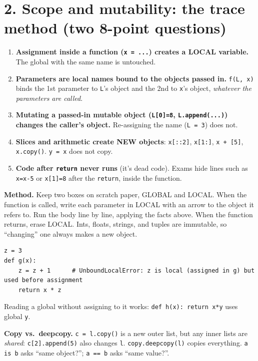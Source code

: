 \documentclass[10pt]{article}
\newcommand{\code}[1]{\lstinline[basicstyle=\ttfamily\small]{#1}}
\begin{document}
\section*{2. Scope and mutability: the trace method (two 8-point questions)}
\begin{keyrule}
\begin{enumerate}[leftmargin=*]
\item \textbf{Assignment inside a function (\code{x = ...}) creates a LOCAL variable.} The global with the same name is untouched.
\item \textbf{Parameters are local names bound to the objects passed in.} \code{f(L, x)} binds the 1st parameter to \code{L}'s object and the 2nd to \code{x}'s object, \emph{whatever the parameters are called}.
\item \textbf{Mutating a passed-in mutable object (\code{L[0]=8}, \code{L.append(...)}) changes the caller's object.} Re-assigning the name (\code{L = 3}) does not.
\item \textbf{Slices and arithmetic create NEW objects}: \code{x[::2]}, \code{x[1:]}, \code{x + [5]}, \code{x.copy()}. \code{y = x} does not copy.
\item \textbf{Code after \code{return} never runs} (it's dead code). Exams hide lines such as \code{x=x-5} or \code{x[1]=8} after the \code{return}, inside the function.
\end{enumerate}
\end{keyrule}
\textbf{Method.} Keep two boxes on scratch paper, GLOBAL and LOCAL. When the function is called, write each parameter in LOCAL with an arrow to the object it refers to. Run the body line by line, applying the facts above. When the function returns, erase LOCAL. Ints, floats, strings, and tuples are immutable, so ``changing'' one always makes a new object.

\begin{trap}
\begin{lstlisting}
z = 3
def g(x):
    z = z + 1      # UnboundLocalError: z is local (assigned in g) but used before assignment
    return x * z
\end{lstlisting}
Reading a global without assigning to it works: \code{def h(x): return x*y} uses global \code{y}.
\end{trap}

\textbf{Copy vs.\ deepcopy.} \code{c = l.copy()} is a new outer list, but any inner lists are \emph{shared}: \code{c[2].append(5)} also changes \code{l}. \code{copy.deepcopy(l)} copies everything. \code{a is b} asks ``same object?''; \code{a == b} asks ``same value?''.
\end{document}
